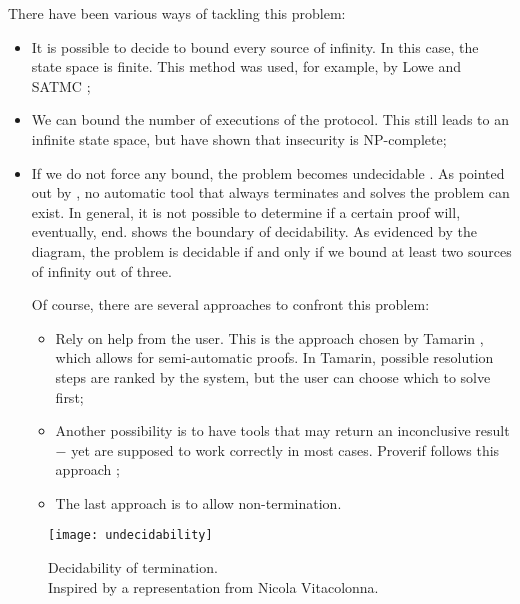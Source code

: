 There have been various ways of tackling this problem:
\begin{itemize}
    \item{It is possible to decide to bound every source of infinity. In this case, the state space is finite. This method was used, for example, by Lowe \cite{LoweNeedhamSchroederPK} and SATMC \cite{SATMC};}

    \item{We can bound the number of executions of the protocol. This still leads to an infinite state space, but \cite{SymbolicModelNPCompleteInsecurity} have shown that insecurity is NP-complete;}

    \item{If we do not force any bound, the problem becomes undecidable \cite{SymbolicModelUndecidability1} \cite{SymbolicModelUndecidability2}. As pointed out by \BLANC{} \cite{SymbolicVerificationBlanchet}, no automatic tool that always terminates and solves the problem can exist. In general, it is not possible to determine if a certain proof will, eventually, end.  shows the boundary of decidability. As evidenced by the diagram, the problem is decidable if and only if we bound at least two sources of infinity out of three.

                Of course, there are several approaches to confront this problem:

                \begin{itemize}
                    \item{Rely on help from the user. This is the approach chosen by Tamarin \cite{TamarinFoundations}, which allows for semi-automatic proofs. In Tamarin, possible resolution steps are ranked by the system, but the user can choose which to solve first;}
                    \item{Another possibility is to have tools that may return an inconclusive result $-$ yet are supposed to work correctly in most cases. Proverif follows this approach \cite{SymbolicVerificationBlanchet};}
                    \item{The last approach is to allow non-termination.}
                \end{itemize}
          }
\end{itemize}


\begin{figure}[t]
    \texttt{[image: undecidability]}
    \centering
    \caption{Decidability of termination.\\Inspired by a representation from Nicola Vitacolonna.}
    \label{fig:undecidability}
\end{figure}